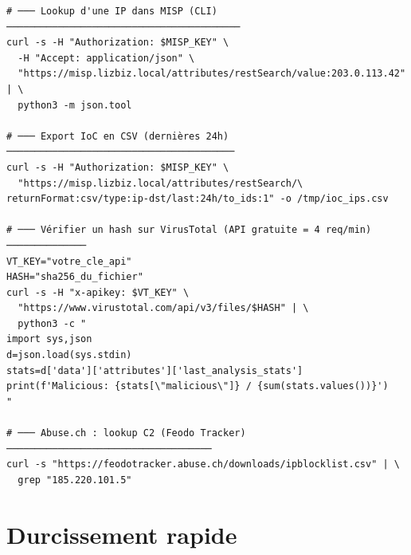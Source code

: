 \begin{lstlisting}[style=StyleTerminal,
  caption={Commandes essentielles: MISP API et CTI},
  label={lst:tools-cti}]
# ─── Lookup d'une IP dans MISP (CLI) ─────────────────────────────────────────
curl -s -H "Authorization: $MISP_KEY" \
  -H "Accept: application/json" \
  "https://misp.lizbiz.local/attributes/restSearch/value:203.0.113.42" | \
  python3 -m json.tool

# ─── Export IoC en CSV (dernières 24h) ────────────────────────────────────────
curl -s -H "Authorization: $MISP_KEY" \
  "https://misp.lizbiz.local/attributes/restSearch/\
returnFormat:csv/type:ip-dst/last:24h/to_ids:1" -o /tmp/ioc_ips.csv

# ─── Vérifier un hash sur VirusTotal (API gratuite = 4 req/min) ──────────────
VT_KEY="votre_cle_api"
HASH="sha256_du_fichier"
curl -s -H "x-apikey: $VT_KEY" \
  "https://www.virustotal.com/api/v3/files/$HASH" | \
  python3 -c "
import sys,json
d=json.load(sys.stdin)
stats=d['data']['attributes']['last_analysis_stats']
print(f'Malicious: {stats[\"malicious\"]} / {sum(stats.values())}')
"

# ─── Abuse.ch : lookup C2 (Feodo Tracker) ────────────────────────────────────
curl -s "https://feodotracker.abuse.ch/downloads/ipblocklist.csv" | \
  grep "185.220.101.5"
\end{lstlisting}

\section{Durcissement rapide}
\label{ann:tools-hardening}

